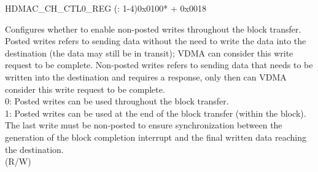\addtocounter{Regfloat}{-1}
\begin{register}{H}{DMAC\_CH\_CTL0\_REG (: 1-4)}{0x0100* + 0x0018}
\begin{regdesc}\begin{reglist}
\item [Continued from the previous page...]
\label{fielddesc:DMACCHNNONPOSTEDLASTWRITEEN}\item [DMAC\_CH\regindex{n}\_NONPOSTED\_LASTWRITE\_EN] Configures whether to enable non-posted writes throughout the block transfer. \\
Posted writes refers to sending data without the need to write the data into the destination (the data may still be in transit); VDMA can consider this write request to be complete. Non-posted writes refers to sending data that needs to be written into the destination and requires a response, only then can VDMA consider this write request to be complete. \\
0: Posted writes can be used throughout the block transfer. \\
1: Posted writes can be used at the end of the block transfer (within the block). The last write must be non-posted to ensure synchronization between the generation of the block completion interrupt and the final written data reaching the destination. \\
(R/W)
\end{reglist}\end{regdesc}
\end{register}


